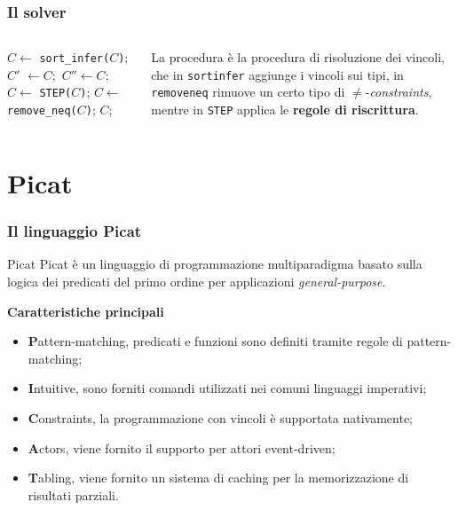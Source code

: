 \documentclass{beamer}
\begin{document}
\begin{frame}
  \frametitle{Il solver \satset{}}
  \begin{columns}[c]

    \begin{algorithmic}[1]
      \State $C \gets $ \texttt{sort\_infer($C$)};
      \Repeat
      \State $C'$ $\gets C;$
      \Repeat
      \State $C'' \gets C;$
      \State $C \gets $ \texttt{STEP($C$)};
      \State $C \gets $ \texttt{remove\_neq($C$)};
      \State
      \State\Return $C$;
      \EndProcedure
    \end{algorithmic}

    La procedura \satset{} è la procedura di risoluzione dei vincoli,
    che in \texttt{sort\textunderscore infer} aggiunge i vincoli sui
    tipi, in \texttt{remove\textunderscore neq} rimuove un certo tipo
    di $\neq$-\textit{constraints}, mentre in \texttt{STEP} applica le
    \textbf{regole di riscrittura}.
  \end{columns}
\end{frame}

\section{Picat}

\begin{frame}
  \frametitle{Il linguaggio Picat}
  \begin{block}{Picat}
    Picat è un linguaggio di programmazione multiparadigma basato
    sulla logica dei predicati del primo ordine per applicazioni
    \emph{general-purpose}.
  \end{block}
  \medskip
  \textbf{Caratteristiche principali}
  \begin{itemize}
  \item \textbf{P}attern-matching, predicati e funzioni sono definiti
    tramite regole di pattern-matching;
  \item \textbf{I}ntuitive, sono forniti comandi utilizzati nei comuni
    linguaggi imperativi;
  \item \textbf{C}onstraints, la programmazione con vincoli è
    supportata nativamente;
  \item \textbf{A}ctors, viene fornito il supporto per attori
    event-driven;
  \item \textbf{T}abling, viene fornito un sistema di caching per
    la memorizzazione di risultati parziali.
  \end{itemize}
\end{frame}
\end{document}
